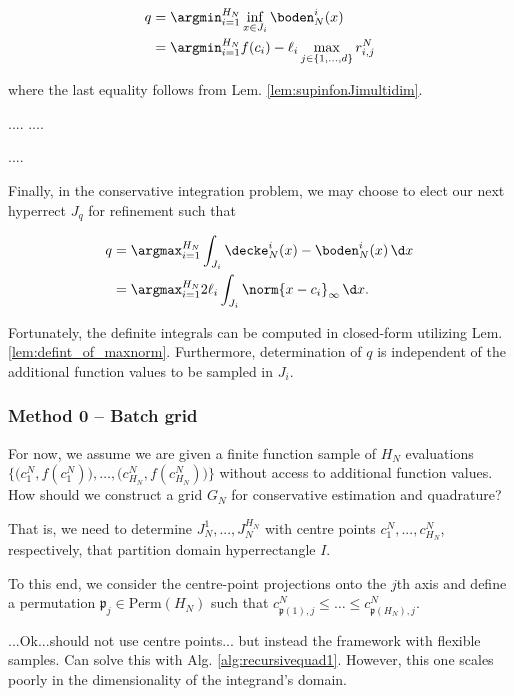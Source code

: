 \begin{align}
q &= \argmin_{i=1}^{H_N} \inf_{x \in J_i} \boden_N^i(x) \\
 &= \argmin_{i=1}^{H_N}  f(c_i) - \ell_i  \max_{j \in \{1,...,d\}} r_{i,j}^N \\
\end{align}

where the last equality follows from Lem. \ref{lem:supinfonJimultidim}.


....
....

....

Finally, in the conservative integration problem, we may choose to elect our next hyperrect $J_q$ for refinement such that 

\begin{align}
q &= \argmax_{i=1}^{H_N} \int_{J_i} \decke_N^i (x) - \boden_N^i(x) \, \d x \\
& = \argmax_{i=1}^{H_N} 2 \ell_i \int_{J_i}  \norm{x-c_i}_\infty \, \d x.
\end{align}

Fortunately, the definite integrals can be computed in closed-form utilizing Lem. \ref{lem:defint_of_maxnorm}. Furthermore, determination of $q$ is independent of the additional function values to be sampled in $J_i$.


\subsubsection{Method 0 -- Batch grid}
For now, we assume we are given a finite function sample of ${H_N}$ evaluations $\{\bigl(c_1^N,f(c_1^N)\bigr),\ldots,\bigl(c_{H_N}^N,f(c_{H_N}^{N})\bigr)\}$ without access to additional function values. How should we construct a grid $G_N$ for conservative estimation and quadrature?

That is, we need to determine $J_N^1,...,J_N^{H_N}$ with centre points $c_1^N,...,c_{H_N}^N$, respectively, that partition domain hyperrectangle $I$.

To this end, we consider the centre-point projections onto the $j$th axis and define a permutation $\mathfrak p_j \in \text{Perm}(H_N)$ such that $c_{\mathfrak p (1),j}^N \leq \ldots \leq c_{\mathfrak p (H_N),j}^N$.

...Ok...should not use centre points... but instead the framework with flexible samples.
Can solve this with Alg. \ref{alg:recursivequad1}. However, this one scales poorly in the dimensionality of the integrand's domain.